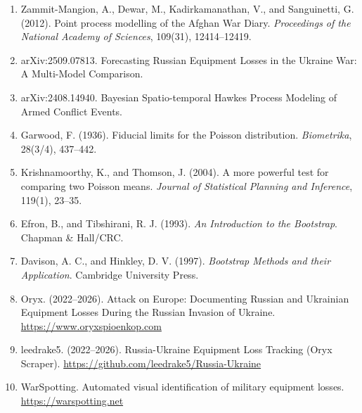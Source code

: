 \documentclass[a4paper,11pt]{article}
\begin{document}
\begin{enumerate}
  \item Zammit-Mangion, A., Dewar, M., Kadirkamanathan, V., and Sanguinetti, G. (2012). Point process modelling of the Afghan War Diary. \textit{Proceedings of the National Academy of Sciences}, 109(31), 12414--12419.
  \item arXiv:2509.07813. Forecasting Russian Equipment Losses in the Ukraine War: A Multi-Model Comparison.
  \item arXiv:2408.14940. Bayesian Spatio-temporal Hawkes Process Modeling of Armed Conflict Events.
  \item Garwood, F. (1936). Fiducial limits for the Poisson distribution. \textit{Biometrika}, 28(3/4), 437--442.
  \item Krishnamoorthy, K., and Thomson, J. (2004). A more powerful test for comparing two Poisson means. \textit{Journal of Statistical Planning and Inference}, 119(1), 23--35.
  \item Efron, B., and Tibshirani, R. J. (1993). \textit{An Introduction to the Bootstrap}. Chapman \& Hall/CRC.
  \item Davison, A. C., and Hinkley, D. V. (1997). \textit{Bootstrap Methods and their Application}. Cambridge University Press.
  \item Oryx. (2022--2026). Attack on Europe: Documenting Russian and Ukrainian Equipment Losses During the Russian Invasion of Ukraine. \url{https://www.oryxspioenkop.com}
  \item leedrake5. (2022--2026). Russia-Ukraine Equipment Loss Tracking (Oryx Scraper). \url{https://github.com/leedrake5/Russia-Ukraine}
  \item WarSpotting. Automated visual identification of military equipment losses. \url{https://warspotting.net}
\end{enumerate}
\end{document}
